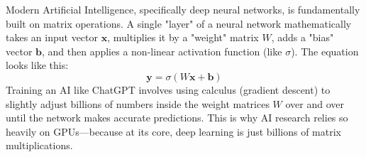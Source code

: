 Modern Artificial Intelligence, specifically deep neural networks, is fundamentally built on matrix operations. A single "layer" of a neural network mathematically takes an input vector $\mathbf{x}$, multiplies it by a "weight" matrix $W$, adds a "bias" vector $\mathbf{b}$, and then applies a non-linear activation function (like $\sigma$). The equation looks like this:
\[ \mathbf{y} = \sigma(W\mathbf{x} + \mathbf{b}) \]
Training an AI like ChatGPT involves using calculus (gradient descent) to slightly adjust billions of numbers inside the weight matrices $W$ over and over until the network makes accurate predictions. This is why AI research relies so heavily on GPUs—because at its core, deep learning is just billions of matrix multiplications.

